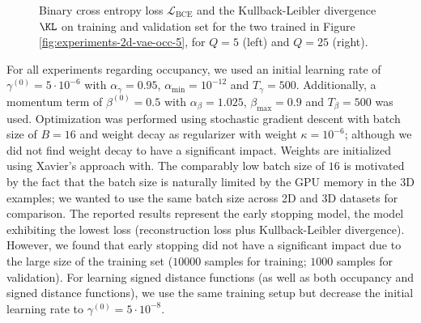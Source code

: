 \begin{figure}
\begin{subfigure}[t]{0.48\textwidth}
  \end{subfigure}
  \caption{Binary cross entropy loss $\mathcal{L}_{\text{BCE}}$
  and the Kullback-Leibler divergence $\KL$ on training and validation set for
  the two \VAEs trained in Figure \ref{fig:experiments-2d-vae-occ-5},
  \ie for $Q = 5$ (left) and $Q = 25$ (right).}
  \label{fig:appendix-experiments-2d-vae-occ-5}
\end{figure}

For all experiments regarding occupancy, we used an initial learning rate 
of $\gamma^{(0)} = 5\cdot 10^{-6}$ with $\alpha_{\gamma} = 0.95$,
$\alpha_{\min} = 10^{-12}$ and $T_{\gamma} = 500$. Additionally, a momentum
term of $\beta^{(0)} = 0.5$ with $\alpha_{\beta} = 1.025$,
$\beta_{\max} = 0.9$ and $T_{\beta} = 500$ was used. Optimization
was performed using stochastic gradient descent with batch size of $B = 16$ and
weight decay as regularizer with weight $\kappa = 10^{-6}$; although
we did not find weight decay to have a significant impact. Weights are initialized
using Xavier's approach with. The comparably low
batch size of $16$ is motivated by the fact that the batch size is naturally
limited by the GPU memory in the 3D examples; we wanted to use the same batch size
across 2D and 3D datasets for comparison. The reported results represent the 
early stopping model, \ie the model exhibiting the lowest loss (reconstruction
loss plus Kullback-Leibler divergence). However, we found that early stopping did
not have a significant impact due to the large size of the training set
($10000$ samples for training; $1000$ samples for validation).
For learning signed distance functions (as well as both occupancy and
signed distance functions), we use the same training setup but decrease
the initial learning rate to $\gamma^{(0)} = 5\cdot 10^{-8}$.

